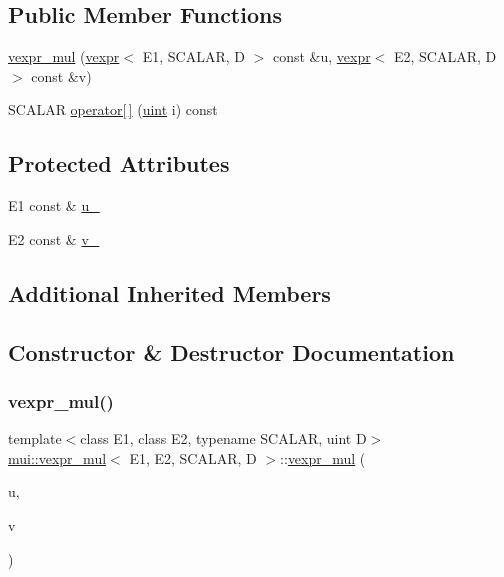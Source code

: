 \subsection*{Public Member Functions}
\begin{DoxyCompactItemize}
\item 
\hyperlink{structmui_1_1vexpr__mul_ac93dd0e7c2f8dffdc5c9996dc4a1a050}{vexpr\+\_\+mul} (\hyperlink{structmui_1_1vexpr}{vexpr}$<$ E1, S\+C\+A\+L\+AR, D $>$ const \&u, \hyperlink{structmui_1_1vexpr}{vexpr}$<$ E2, S\+C\+A\+L\+AR, D $>$ const \&v)
\item 
S\+C\+A\+L\+AR \hyperlink{structmui_1_1vexpr__mul_ab1b369afda3cc584f638a5d471a3a775}{operator\mbox{[}$\,$\mbox{]}} (\hyperlink{namespacemui_af15a3e7188a2117fb9965277bb0cacd2}{uint} i) const
\end{DoxyCompactItemize}
\subsection*{Protected Attributes}
\begin{DoxyCompactItemize}
\item 
E1 const  \& \hyperlink{structmui_1_1vexpr__mul_a0b0d2b236c8fff955b60ba5354d46d07}{u\+\_\+}
\item 
E2 const  \& \hyperlink{structmui_1_1vexpr__mul_a1c6611c857bcd820d105c66884eb5bea}{v\+\_\+}
\end{DoxyCompactItemize}
\subsection*{Additional Inherited Members}


\subsection{Constructor \& Destructor Documentation}
\mbox{\label{structmui_1_1vexpr__mul_ac93dd0e7c2f8dffdc5c9996dc4a1a050}} 
\subsubsection{\texorpdfstring{vexpr\+\_\+mul()}{vexpr\_mul()}}
{\footnotesize\ttfamily template$<$class E1, class E2, typename S\+C\+A\+L\+AR, uint D$>$ \\
\hyperlink{structmui_1_1vexpr__mul}{mui\+::vexpr\+\_\+mul}$<$ E1, E2, S\+C\+A\+L\+AR, D $>$\+::\hyperlink{structmui_1_1vexpr__mul}{vexpr\+\_\+mul} (\begin{DoxyParamCaption}\item[{\hyperlink{structmui_1_1vexpr}{vexpr}$<$ E1, S\+C\+A\+L\+AR, D $>$ const \&}]{u,  }\item[{\hyperlink{structmui_1_1vexpr}{vexpr}$<$ E2, S\+C\+A\+L\+AR, D $>$ const \&}]{v }\end{DoxyParamCaption})\hspace{0.3cm}{\ttfamily [inline]}}



